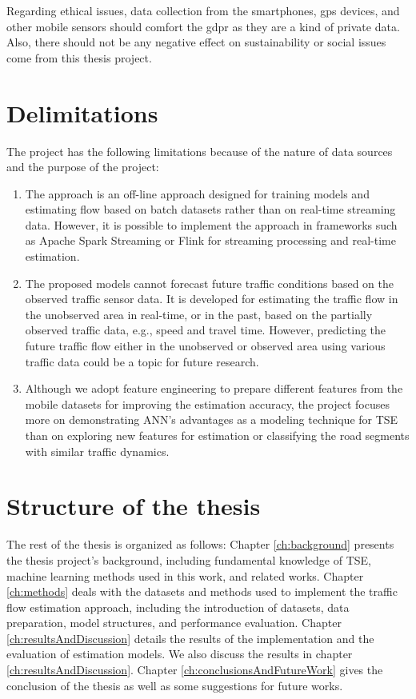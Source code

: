 \documentclass[english]{kththesis}
\begin{document}
Regarding ethical issues, data collection from the smartphones, \gls{gps} devices, and other mobile sensors should comfort the \gls{gdpr} as they are a kind of private data. Also, there should not be any negative effect on sustainability or social issues come from this thesis project.

\section{Delimitations}
The project has the following limitations because of the nature of data sources and the purpose of the project:
\begin{enumerate}
    \item The approach is an off-line approach designed for training models and estimating flow based on batch datasets rather than on real-time streaming data. However, it is possible to implement the approach in frameworks such as Apache Spark Streaming or Flink for streaming processing and real-time estimation. 
    \item The proposed models cannot forecast future traffic conditions based on the observed traffic sensor data. It is developed for estimating the traffic flow in the unobserved area in real-time, or in the past, based on the partially observed traffic data, e.g., speed and travel time. However, predicting the future traffic flow either in the unobserved or observed area using various traffic data could be a topic for future research.
    \item Although we adopt feature engineering to prepare different features from the mobile datasets for improving the estimation accuracy, the project focuses more on demonstrating ANN's advantages as a modeling technique for TSE than on exploring new features for estimation or classifying the road segments with similar traffic dynamics.
\end{enumerate}


\section{Structure of the thesis}
The rest of the thesis is organized as follows: Chapter \ref{ch:background} presents the thesis project's background, including fundamental knowledge of TSE, machine learning methods used in this work, and related works. Chapter \ref{ch:methods} deals with the datasets and methods used to implement the traffic flow estimation approach, including the introduction of datasets, data preparation, model structures, and performance evaluation. Chapter \ref{ch:resultsAndDiscussion} details the results of the implementation and the evaluation of estimation models. We also discuss the results in chapter \ref{ch:resultsAndDiscussion}. Chapter \ref{ch:conclusionsAndFutureWork} gives the conclusion of the thesis as well as some suggestions for future works.
\end{document}
